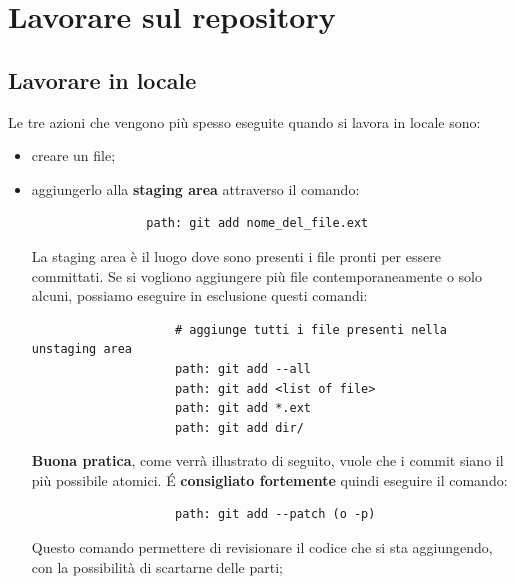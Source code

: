 	

\newpage \clearpage
\section{Lavorare sul repository} %
\label{sec:lavorare_sul_repository}

	\subsection{Lavorare in locale} %
	\label{sub:lavorare_in_locale}
	Le tre azioni che vengono più spesso eseguite quando si lavora in locale sono:
		\begin{itemize}
			\item creare un file;
			\item aggiungerlo alla \textbf{staging area} attraverso il comando:
				\begin{verbatim}
				path: git add nome_del_file.ext
				\end{verbatim}
				\noindent
				La staging area è il luogo dove sono presenti i file pronti per essere committati.
				Se si vogliono aggiungere più file contemporaneamente o solo alcuni, possiamo eseguire in esclusione questi comandi:
					\begin{verbatim}
					# aggiunge tutti i file presenti nella unstaging area
					path: git add --all
					path: git add <list of file>
					path: git add *.ext
					path: git add dir/
					\end{verbatim}
				\noindent
				\textbf{Buona pratica}, come verrà illustrato di seguito, vuole che i commit siano il più possibile atomici. \'E \textbf{consigliato fortemente} quindi eseguire il comando:
					\begin{verbatim}
					path: git add --patch (o -p)
					\end{verbatim}
				\noindent
				Questo comando permettere di revisionare il codice che si sta aggiungendo, con la possibilità di scartarne delle parti;


\end{itemize}
